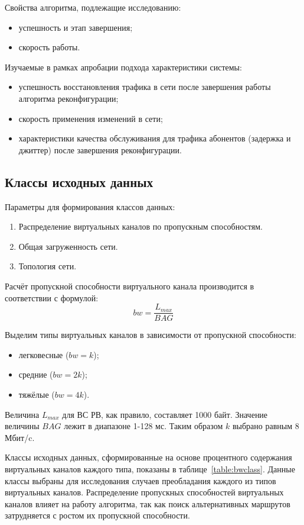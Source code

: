 \documentclass[12pt, a4paper]{article}
\begin{document}
Свойства алгоритма, подлежащие исследованию:
\begin{itemize}
	\item успешность и этап завершения;
	\item скорость работы.
\end{itemize}

Изучаемые в рамках апробации подхода характеристики системы:
\begin{itemize}
	\item успешность восстановления трафика в сети после завершения работы алгоритма реконфигурации;
	\item скорость применения изменений в сети;
	\item характеристики качества обслуживания для трафика абонентов (задержка и джиттер) после завершения реконфигурации.
\end{itemize}

\subsection{Классы исходных данных}
Параметры для формирования классов данных:
\begin{enumerate}
	\item Распределение виртуальных каналов по пропускным способностям.
	\item Общая загруженность сети.
	\item Топология сети.
\end{enumerate}

Расчёт пропускной способности виртуального канала производится в соответствии с формулой:
$$bw = \frac{L_{max}}{BAG}$$

Выделим типы виртуальных каналов в зависимости от пропускной способности:
\begin{itemize}
	\item легковесные ($bw=k$);
	\item средние ($bw=2k$);
	\item тяжёлые ($bw=4k$).
\end{itemize}

Величина $L_{max}$ для ВС РВ, как правило, составляет 1000 байт. Значение величины ${BAG}$ лежит в диапазоне 1-128 мс. Таким образом $k$ выбрано равным 8 Мбит/c.

Классы исходных данных, сформированные на основе процентного содержания виртуальных каналов каждого типа, показаны в таблице~\ref{table:bwclass}. Данные классы выбраны для исследования случаев преобладания каждого из типов виртуальных каналов. Распределение пропускных способностей виртуальных каналов влияет на работу алгоритма, так как поиск альтернативных маршрутов затрудняется с ростом их пропускной способности.
\end{document}
